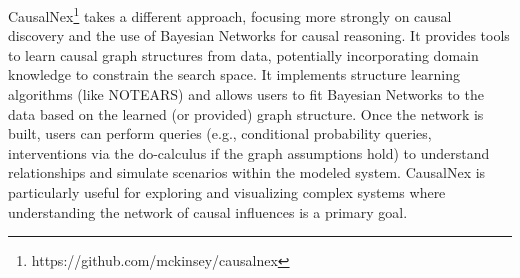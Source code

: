 CausalNex\footnote{https://github.com/mckinsey/causalnex} takes a different approach, focusing more strongly on causal discovery and the use of Bayesian Networks for causal reasoning. It provides tools to learn causal graph structures from data, potentially incorporating domain knowledge to constrain the search space. It implements structure learning algorithms (like NOTEARS) and allows users to fit Bayesian Networks to the data based on the learned (or provided) graph structure. Once the network is built, users can perform queries (e.g., conditional probability queries, interventions via the do-calculus if the graph assumptions hold) to understand relationships and simulate scenarios within the modeled system. CausalNex is particularly useful for exploring and visualizing complex systems where understanding the network of causal influences is a primary goal.

\newpage
